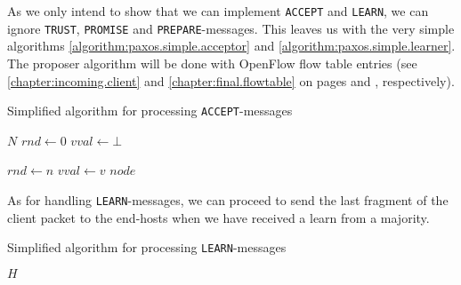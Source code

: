 As we only intend to show that we can implement \texttt{ACCEPT} and
\texttt{LEARN}, we can ignore \texttt{TRUST}, \texttt{PROMISE} and
\texttt{PREPARE}-messages.  This leaves us with the very simple algorithms
\ref{algorithm:paxos.simple.acceptor} and
\ref{algorithm:paxos.simple.learner}.  The proposer algorithm will be done
with OpenFlow flow table entries (see \ref{chapter:incoming.client}
    and \ref{chapter:final.flowtable} on pages
    \pageref{chapter:final.flowtable} and 
    \pageref{chapter:incoming.client}, respectively).

\begin{algorithm}
  \caption{Simplified algorithm for processing \texttt{ACCEPT}-messages}
  \label{algorithm:paxos.simple.acceptor}
  \begin{algorithmic}
    \State $N$
    \State $rnd \gets 0$ 
    \State $vval \gets \bot$ 
    \State

        \State $rnd\gets n$
        \State $vval\gets v$ 
           \State {}
                         {$node$}
        \EndForIn
      \EndIf
    \EndOn
  \end{algorithmic}
\end{algorithm}

As for handling \texttt{LEARN}-messages, we can proceed to send the last
fragment of the client packet to the end-hosts when we have received a
learn from a majority.

\begin{algorithm}[H]
  \caption{Simplified algorithm for processing \texttt{LEARN}-messages}
  \label{algorithm:paxos.simple.learner}
  \begin{algorithmic}
    \State $H$ 
    \State

          \State {}
        \EndForIn
      \EndIf
    \EndOn
  \end{algorithmic}
\end{algorithm}
